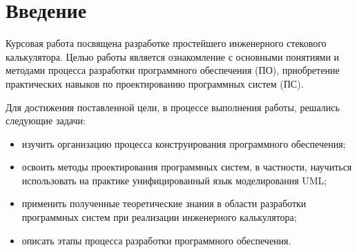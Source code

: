 \section*{Введение}

Курсовая работа посвящена разработке простейшего 
инженерного стекового калькулятора.
Целью работы является ознакомление с основными понятиями и методами процесса разработки программного обеспечения (ПО), приобретение практических навыков по проектированию программных систем (ПС).

Для достижения поставленной цели, в процессе выполнения работы, решались 
следующие задачи:
\begin{itemize}
  \item изучить организацию процесса конструирования программного обеспечения;
  \item освоить методы проектирования программных систем, в частности, научиться 
использовать на практике унифицированный язык моделирования UML;
  \item применить полученные теоретические знания в области разработки 
программных систем при реализации инженерного калькулятора;
  \item описать этапы процесса разработки программного обеспечения.
\end{itemize}


\endinput

